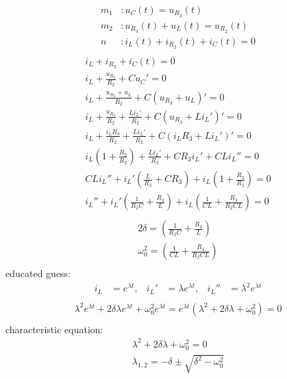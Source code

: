 \documentclass[a4paper]{article}
\begin{document}
\begin{align*}
	m_1&: u_C(t) = u_{R_2}(t)\\
	m_2&: u_{R_3}(t) + u_L(t) = u_{R_2}(t)\\
	n&: i_L(t) + i_{R_2}(t) + i_C(t) = 0\\
\end{align*}
\begin{align*}
	i_L + i_{R_2} + i_C(t) = 0\\
	i_L + \frac{u_{R_2}}{R_2} + Cu_C' = 0\\
	i_L + \frac{u_{R_3} + u_L}{R_2} + C(u_{R_3} + u_L)' = 0\\
	i_L + \frac{u_{R_3}}{R_2} + \frac{Li_L'}{R_2} + C(u_{R_3} + Li_L')' = 0\\
	i_L + \frac{i_LR_3}{R_2} + \frac{Li_L'}{R_2} + C(i_LR_3 + Li_L')' = 0\\
	i_L \left(1 + \frac{R_3}{R_2} \right) + \frac{Li_L'}{R_2} + CR_3i_L' + CLi_L'' = 0\\
	CLi_L'' + i_L'\left( \frac{L}{R_2} + CR_3 \right) + i_L \left(1 + \frac{R_3}{R_2} \right) = 0\\
	i_L'' + i_L'\left( \frac{1}{R_2C} + \frac{R_3}{L} \right) + i_L \left(\frac{1}{CL} + \frac{R_3}{R_2CL} \right) = 0\\
\end{align*}
\begin{align*}
	2\delta = \left( \frac{1}{R_2C} + \frac{R_3}{L} \right)\\
	\omega_0^2 = \left(\frac{1}{CL} + \frac{R_3}{R_2CL} \right)\\
\end{align*}
educated guess:
\begin{align*}
	i_L &= e^{\lambda t},&
	i_L' &= \lambda e^{\lambda t},&
	i_L'' &= \lambda^2 e^{\lambda t}\\
\end{align*}
\begin{align*}
	\lambda^2 e^{\lambda t} + 2\delta\lambda e^{\lambda t} + \omega_0^2 e^{\lambda t} 
	= e^{\lambda t}(\lambda^2 + 2\delta\lambda + \omega_0^2) = 0\\
\end{align*}
characteristic equation:
\begin{align*}
	\lambda^2 + 2\delta\lambda + \omega_0^2 = 0\\
	\lambda_{1,2} = -\delta \pm \sqrt{\delta^2 - \omega_0^2}
\end{align*}
\end{document}
